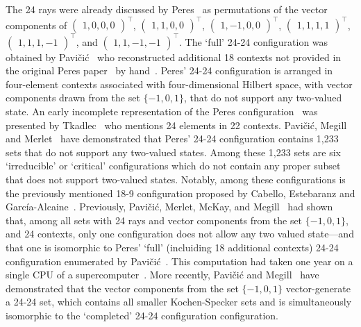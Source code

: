 \documentclass[
  twocolumn,
 showpacs,
 showkeys,
 preprintnumbers,
 amsmath,amssymb,
 aps,
 prl,
  longbibliography,
 floatfix,
 ]{revtex4-2}
\begin{document}
The 24 rays were already discussed by Peres~\cite{peres-91} as permutations of the vector components of
$\begin{pmatrix}
{1, 0, 0, 0}
\end{pmatrix}^\intercal $,
$\begin{pmatrix}
{1, 1, 0, 0}
\end{pmatrix}^\intercal $,
$\begin{pmatrix}
{1, -1, 0, 0}
\end{pmatrix}^\intercal $,
$\begin{pmatrix}
{1, 1, 1, 1}
\end{pmatrix}^\intercal $,
$\begin{pmatrix}
{1, 1, 1, -1}
\end{pmatrix}^\intercal $, and
$\begin{pmatrix}
{1, 1, -1, -1}
\end{pmatrix}^\intercal $.
The `full' 24-24 configuration was obtained by Pavi\v{c}i\'{c}~\cite{pavicic-2004ksafq} who
reconstructed additional 18 contexts not provided in the original Peres paper~\cite{peres-91} by hand~\cite{pavicic-private-commun-2024}.
Peres' 24-24 configuration is arranged in four-element contexts  associated with four-dimensional Hilbert space, with vector
components drawn from the set $\{-1,0,1\}$, that do not support any two-valued state.
An early incomplete representation of the Peres configuration~\cite{peres-91} was presented by Tkadlec~\cite[Figure~1]{tkadlec-00}  who mentions  24 elements in 22 contexts.
Pavi\v{c}i\'{c}, Megill and Merlet~\cite[Table~1]{pavicic-2010nkss}
have demonstrated that Peres' 24-24 configuration contains 1,233 sets that do not support any two-valued states.
Among these 1,233 sets are six `irreducible' or `critical' configurations which do not contain any proper subset that does not support two-valued states.
Notably, among these configurations is the previously mentioned 18-9 configuration proposed by Cabello, Estebaranz and Garc{\'{i}}a-Alcaine~\cite{cabello-96}.
Previously, Pavi\v{c}i\'{c}, Merlet, McKay, and Megill~\cite[Section~5(viii)]{pavicic-2005ksw,pavicic-2005csvcorri} had shown that,
among all sets with 24 rays and vector components from the set $\{-1,0,1\}$, and
24 contexts, only one configuration does not
allow any two valued state---and that one is isomorphic to Peres' `full' (incluiding 18 additional contexts)
24-24 configuration enumerated by Pavi\v{c}i\'{c}~\cite{pavicic-2004ksafq}.
This computation had taken one year on a single CPU of a supercomputer~\cite{pavicic-private-commun-2024}.
More recently, Pavi\v{c}i\'{c} and Megill~\cite[Table~1]{Pavii2018} have demonstrated that the vector components from the set $\{-1,0,1\}$
vector-generate a  24-24 set, which contains all smaller Kochen-Specker sets  and is simultaneously isomorphic to the `completed'  24-24 configuration configuration.
\end{document}

